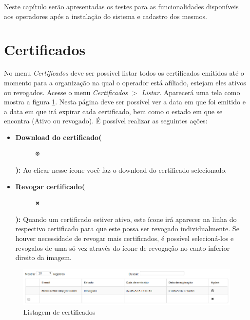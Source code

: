                   

Neste capítulo serão apresentadas os testes para as funcionalidades disponíveis aos operadores após a instalação do sistema e cadastro dos mesmos.

\section{Certificados}

No menu \textit{Certificados} deve ser possível listar todos os certificados emitidos até o momento para a organização na qual o operador está afiliado, estejam eles ativos ou revogados. Acesse o menu \textit{Certificados $>$ Listar}. Aparecerá uma tela como mostra a figura \ref{fig:listarcertop}. Nesta página deve ser possível ver a data em que foi emitido e a data em que irá expirar cada certificado, bem como o estado em que se encontra (Ativo ou revogado).
É possível realizar as seguintes ações:

\begin{itemize}

	\item \textbf{Download do certificado(}\begin{figure} \includegraphics[height=10]{images/iconedownload} \end{figure} \textbf{):} Ao clicar nesse ícone você faz o download do certificado selecionado.
	\item \textbf{Revogar certificado(}\begin{figure} \includegraphics[height=10]{images/iconedelete2} \end{figure} \textbf{):} Quando um certificado estiver ativo, este ícone irá aparecer na linha do respectivo certificado para que este possa ser revogado individualmente. Se houver necessidade de revogar mais certificados, é possível selecioná-los e revogalos de uma só vez através do ícone de revogação no canto inferior direito da imagem. 
	
\end{itemize}

\begin{figure}[ht]
     \centering
     \includegraphics[scale=0.5]{images/listarcertop.png}
     \caption{Listagem de certificados}
     \label{fig:listarcertop}
\end{figure}

